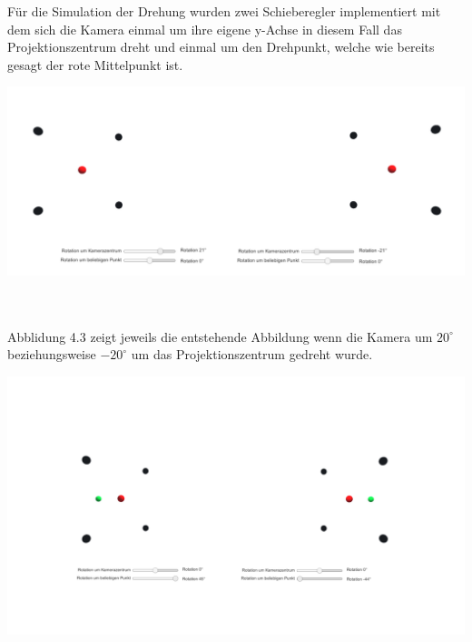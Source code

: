 Für die Simulation der Drehung wurden zwei Schieberegler implementiert mit dem sich die Kamera einmal um ihre eigene y-Achse in diesem Fall das Projektionszentrum dreht und einmal um den Drehpunkt, welche wie bereits gesagt der rote Mittelpunkt ist.


\begin{minipage}{\linewidth}
	\centering
	\includegraphics[width=1.\linewidth]{images/DrehungPZ.png}
\end{minipage}\\ \\

Abblidung 4.3 zeigt jeweils die entstehende Abbildung wenn die Kamera um \ensuremath{20^\circ} beziehungsweise \ensuremath{-20^\circ} um das Projektionszentrum gedreht wurde.

\begin{minipage}{\linewidth}
	\centering
	\includegraphics[width=1.\linewidth]{images/DrehungDZ.png}
\end{minipage}\\ \\

